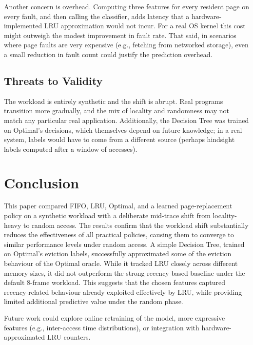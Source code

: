 \documentclass[11pt, a4paper]{article}
\begin{document}
Another concern is overhead.
Computing three features for every resident page on every fault, and then calling the classifier, adds latency that a hardware-implemented LRU approximation would not incur.
For a real OS kernel this cost might outweigh the modest improvement in fault rate.
That said, in scenarios where page faults are very expensive (e.g., fetching from networked storage), even a small reduction in fault count could justify the prediction overhead.

\subsection{Threats to Validity}

The workload is entirely synthetic and the shift is abrupt.
Real programs transition more gradually, and the mix of locality and randomness may not match any particular real application.
Additionally, the Decision Tree was trained on Optimal's decisions, which themselves depend on future knowledge; in a real system, labels would have to come from a different source (perhaps hindsight labels computed after a window of accesses).


\section{Conclusion}
\label{sec:conclusion}

This paper compared FIFO, LRU, Optimal, and a learned page-replacement policy on a synthetic workload with a deliberate mid-trace shift from locality-heavy to random access.
The results confirm that the workload shift substantially reduces the effectiveness of all practical policies, causing them to converge to similar performance levels under random access.
A simple Decision Tree, trained on Optimal's eviction labels, successfully approximated some of the eviction behaviour of the Optimal oracle. While it tracked LRU closely across different memory sizes, it did not outperform the strong recency-based baseline under the default 8-frame workload. This suggests that the chosen features captured recency-related behaviour already exploited effectively by LRU, while providing limited additional predictive value under the random phase.

Future work could explore online retraining of the model, more expressive features (e.g., inter-access time distributions), or integration with hardware-approximated LRU counters.
\end{document}
